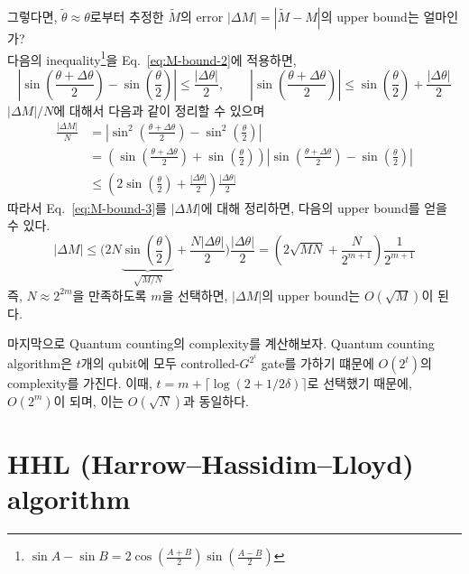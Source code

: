 \vspace{1em}
그렇다면, $\tilde \theta \approx \theta$로부터 추정한 $\tilde M$의 error $|\Delta M| = |\tilde M - M|$의 upper bound는 얼마인가?\\
다음의 inequality\footnote{$\sin A-\sin B=2 \cos \left(\frac{A+B}{2}\right) \sin \left(\frac{A-B}{2}\right)$}을 Eq.~\eqref{eq:M-bound-2}에 적용하면, 
\begin{equation*}
   \left|\sin \left(\dfrac{\theta+\Delta \theta}{2}\right)-\sin \left(\dfrac{\theta}{2}\right)\right| \leq \frac{|\Delta \theta|}{2}, \qquad \left|\sin \left(\frac{\theta+\Delta \theta}{2}\right)\right| \leq \sin \left(\frac{\theta}{2}\right)+ \frac{|\Delta \theta|}{2}
\end{equation*}
$|\Delta M|/N$에 대해서 다음과 같이 정리할 수 있으며
\begin{align}
\frac{|\Delta M|}{N}&= \left|\sin ^2\left(\frac{\theta+\Delta \theta}{2}\right)-\sin ^2\left(\frac{\theta}{2}\right)\right| \label{eq:M-bound-1} \\ 
                    &=\left(\sin \left(\frac{\theta+\Delta \theta}{2}\right)+\sin \left(\frac{\theta}{2}\right)\right)\left|\sin \left(\frac{\theta+\Delta \theta}{2}\right)-\sin \left(\frac{\theta}{2}\right)\right| \label{eq:M-bound-2}\\
                    & \leq\left(2 \sin \left(\frac{\theta}{2}\right)+\frac{|\Delta \theta|}{2}\right) \frac{|\Delta \theta|}{2} \label{eq:M-bound-3}
\end{align}
따라서 Eq.~\eqref{eq:M-bound-3}를 $|\Delta M|$에 대해 정리하면, 다음의 upper bound를 얻을 수 있다.
\begin{equation*}
  |\Delta M| \leq \Bigg(2 N \underbrace{\sin \left(\frac{\theta}{2}\right)}_{\sqrt{M/N}}+\frac{N |\Delta \theta|}{2}\Bigg) \frac{|\Delta \theta|}{2}  = \left(2 \sqrt{M N}+\frac{N}{2^{m+1}}\right) \frac{1}{2^{m+1}}
\end{equation*}
즉, $N \approx 2^{2m}$을 만족하도록 $m$을 선택하면, $|\Delta M|$의 upper bound는 $O(\sqrt M)$이 된다.

\vspace{1em}
마지막으로 Quantum counting의 complexity를 계산해보자. Quantum counting algorithm은 $t$개의 qubit에 모두 controlled-$G^{2^i}$ gate를 가하기 떄문에 $O(2^t)$의 complexity를 가진다.
이때, $t = m + \lceil \log (2 + 1/2\delta) \rceil$로 선택했기 때문에, $O(2^m)$이 되며, 이는 $O(\sqrt N)$과 동일하다. 

\section{HHL (Harrow–Hassidim–Lloyd) algorithm}

